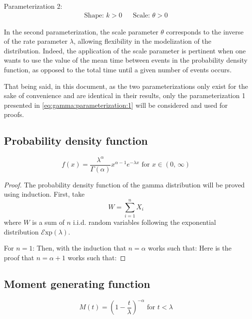 \documentclass[12pt]{article}
\newcommand{\E}{\mathcal{E}}
\begin{document}
\noindent Parameterization 2:
\vspace*{-24pt}
\begin{align}\label{eq:gamma:parameterization:2}
	\text{Shape: } k>0			&&	\text{Scale: }\theta>0
\end{align}

In the second parameterization, the scale parameter $\theta$ corresponds to the inverse of the rate parameter $\lambda$,
allowing flexibility in the modelization of the distribution. Indeed, the application of the scale parameter is
pertinent when one wants to use the value of the mean time between events in the probability density function, as
opposed to the total time until a given number of events occurs.

That being said, in this document, as the two parameterizations only exist for the sake of convenience and are identical
in their results, only the parameterization 1 presented in \autoref{eq:gamma:parameterization:1} will be considered and
used for proofs.

\subsection{Probability density function}\label{section:gamma:pdf}
\begin{equation*}\label{eq:gamma:pdf:2}
	f(x) = \frac{\lambda^\alpha}{\Gamma(\alpha)}x^{\alpha-1}e^{-\lambda x}\text{ for }x\in (0,\,\infty)
\end{equation*}
\begin{proof}
	The probability density function of the gamma distribution will be proved using induction. First, take
	\begin{equation*}
		W=\sum^n_{i=1}X_i
	\end{equation*}
	where $W$ is a sum of $n$ i.i.d. random variables following the exponential distribution $\E\text{xp}(\lambda)$.

	\noindent For $n=1$:
	Then, with the induction that $n=\alpha$ works such that:
	Here is the proof that $n=\alpha+1$ works such that:
\end{proof}

\subsection{Moment generating function}
\begin{equation*}\label{eq:gamma-mgf-2}
	M(t) = \left(1-\frac{t}{\lambda}\right)^{-\alpha}\text{ for }t < \lambda
\end{equation*}
\end{document}
